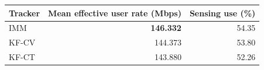 \begin{tabular}{lrr}
\toprule
Tracker & Mean effective user rate (Mbps) & Sensing use (\%) \\
\midrule
IMM & \textbf{146.332} & 54.35 \\
KF-CV & 144.373 & 53.80 \\
KF-CT & 143.880 & 52.26 \\
\bottomrule
\end{tabular}
